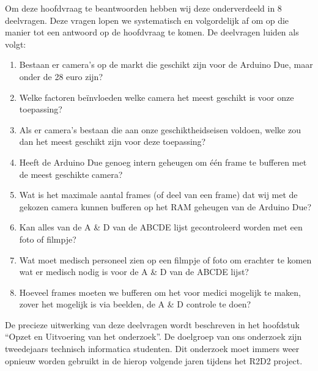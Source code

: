 \documentclass{article}
\begin{document}
Om deze hoofdvraag te beantwoorden hebben wij deze onderverdeeld in 8 deelvragen. Deze vragen lopen we systematisch en volgordelijk af om op die manier tot een antwoord op de hoofdvraag te komen. De deelvragen luiden als volgt:

\begin{enumerate}
	\item Bestaan er camera’s op de markt die geschikt zijn voor de Arduino Due, maar onder de 28 euro zijn?
	\item Welke factoren beïnvloeden welke camera het meest geschikt is voor onze toepassing?
	\item Als er camera’s bestaan die aan onze geschiktheidseisen voldoen, welke zou dan het meest geschikt zijn voor deze toepassing?
	\item Heeft de Arduino Due genoeg intern geheugen om één frame te bufferen met de meest geschikte camera?
	\item Wat is het maximale aantal frames (of deel van een frame) dat wij met de gekozen camera kunnen bufferen op het RAM geheugen van de Arduino Due?
	\item Kan alles van de A {\&} D van de ABCDE lijst gecontroleerd worden met een foto of filmpje?
	\item Wat moet medisch personeel zien op een filmpje of foto om erachter te komen wat er medisch nodig is voor de A {\&} D van de ABCDE lijst?
	\item Hoeveel frames moeten we bufferen om het voor medici mogelijk te maken, zover het mogelijk is via beelden, de A {\&} D controle te doen?
\end{enumerate}
De precieze uitwerking van deze deelvragen wordt beschreven in het hoofdstuk “Opzet en Uitvoering van het onderzoek”.
De doelgroep van ons onderzoek zijn tweedejaars technisch informatica studenten. Dit onderzoek moet immers weer opnieuw worden gebruikt in de hierop volgende jaren tijdens het R2D2 project.

\end{document}
